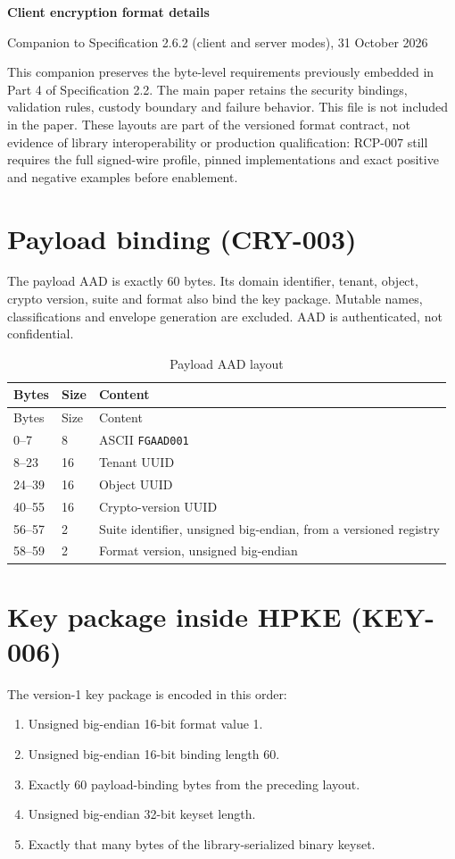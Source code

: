 \documentclass[11pt,a4paper]{article}
\newcommand{\code}[1]{{\small\nolinkurl{#1}}}
\begin{document}
\begin{center}
{\Large\bfseries Client encryption format details}\par
Companion to Specification 2.6.2 (client and server modes), 31 October 2026
\end{center}

This companion preserves the byte-level requirements previously embedded in
Part 4 of Specification 2.2. The main paper retains the security bindings,
validation rules, custody boundary and failure behavior. This file is not
included in the paper. These layouts are part of the versioned format contract,
not evidence of library interoperability or production qualification: RCP-007
still requires the full signed-wire profile, pinned implementations and exact
positive and negative examples before enablement.

\section*{Payload binding (CRY-003)}
The payload AAD is exactly 60 bytes. Its domain identifier, tenant, object,
crypto version, suite and format also bind the key package. Mutable names,
classifications and envelope generation are excluded. AAD is authenticated,
not confidential.

\begin{longtable}{@{}P{0.15\textwidth}P{0.20\textwidth}P{0.55\textwidth}@{}}
\caption{Payload AAD layout}\label{tab:aad}\\
\toprule Bytes & Size & Content\\\midrule\endfirsthead
\toprule Bytes & Size & Content\\\midrule{}--7 & 8 & ASCII \code{FGAAD001}\\
8--23 & 16 & Tenant UUID\\
24--39 & 16 & Object UUID\\
40--55 & 16 & Crypto-version UUID\\
56--57 & 2 & Suite identifier, unsigned big-endian, from a versioned registry\\
58--59 & 2 & Format version, unsigned big-endian\\
\bottomrule
\end{longtable}

\section*{Key package inside HPKE (KEY-006)}
The version-1 key package is encoded in this order:
\begin{enumerate}
\item Unsigned big-endian 16-bit format value 1.
\item Unsigned big-endian 16-bit binding length 60.
\item Exactly 60 payload-binding bytes from the preceding layout.
\item Unsigned big-endian 32-bit keyset length.
\item Exactly that many bytes of the library-serialized binary keyset.
\end{enumerate}
\end{document}
